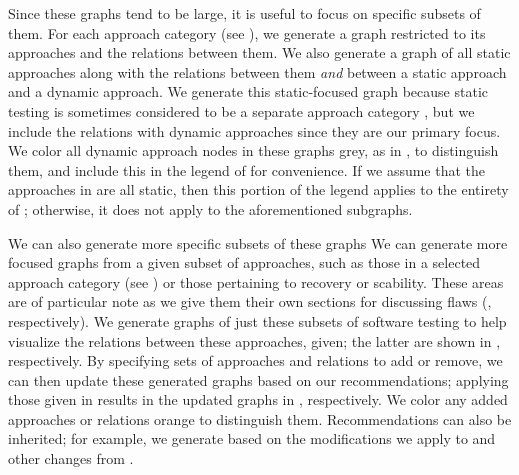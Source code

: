 \fi
Since these graphs tend to be large, it is useful to focus on specific
subsets of them. \ifnotpaper For each approach category (see
    ), we generate a graph restricted to its approaches
    and the relations between them. We also generate a graph of all static
    approaches along with the relations between them \emph{and} between a
    static approach and a dynamic approach. We generate this static-focused
    graph because static testing is sometimes considered to be a separate
    approach category \citep[Fig.~2; see ]{IEEE2022},
    but we include the relations with dynamic approaches since they are our
    primary focus. We color all dynamic approach nodes in these graphs grey,
    as in , to distinguish them, and include this
    in the legend of  for convenience. If we assume
    that the approaches in  are
    all static, then this portion of the legend applies to the entirety of
    ; otherwise, it does not apply to the
    aforementioned subgraphs.

    We can also generate more specific subsets of these graphs
\else We can generate more focused graphs \fi from a given subset of
approaches, such as \ifnotpaper\else those in a selected approach category
    (see ) or \fi those pertaining to recovery or
scability\ifnotpaper. These areas are of particular note as we give them their
own sections for discussing flaws (, respectively).
We generate graphs of just these subsets of software testing to help visualize
the relations between these approaches, given\else; the latter are shown \fi
in , respectively. By
specifying sets of approaches and relations to add or remove, we can then
update these generated graphs based on our recommendations; applying those
given in 
results in the updated graphs in , respectively.
We color any added approaches or relations orange to distinguish them.
\ifnotpaper
    Recommendations can also be inherited; for example, we generate
     based on the modifications we apply to
     and
    other changes from .
\fi

\ifnotpaper
    
\else
    \sntxFlawsTable{}
    \smntcFlawsTable{}
\fi
